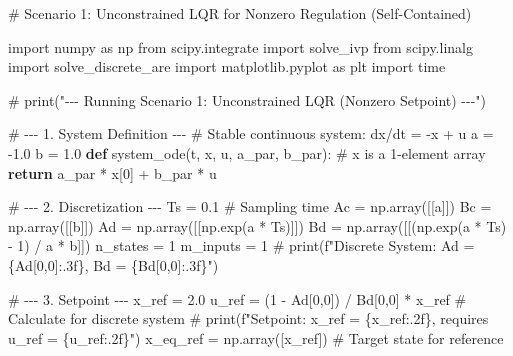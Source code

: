 \documentclass[
  letterpaper,
  DIV=11,
  numbers=noendperiod,
  oneside]{scrartcl}
\newenvironment{Shaded}{\begin{snugshade}}{\end{snugshade}}
\newcommand{\CommentTok}[1]{\textcolor[rgb]{0.37,0.37,0.37}{#1}}
\newcommand{\ControlFlowTok}[1]{\textcolor[rgb]{0.00,0.23,0.31}{\textbf{#1}}}
\newcommand{\DecValTok}[1]{\textcolor[rgb]{0.68,0.00,0.00}{#1}}
\newcommand{\FloatTok}[1]{\textcolor[rgb]{0.68,0.00,0.00}{#1}}
\newcommand{\ImportTok}[1]{\textcolor[rgb]{0.00,0.46,0.62}{#1}}
\newcommand{\KeywordTok}[1]{\textcolor[rgb]{0.00,0.23,0.31}{\textbf{#1}}}
\newcommand{\NormalTok}[1]{\textcolor[rgb]{0.00,0.23,0.31}{#1}}
\newcommand{\OperatorTok}[1]{\textcolor[rgb]{0.37,0.37,0.37}{#1}}
\begin{document}
\begin{Shaded}
\begin{Highlighting}[]
\CommentTok{\# Scenario 1: Unconstrained LQR for Nonzero Regulation (Self{-}Contained)}

\ImportTok{import}\NormalTok{ numpy }\ImportTok{as}\NormalTok{ np}
\ImportTok{from}\NormalTok{ scipy.integrate }\ImportTok{import}\NormalTok{ solve\_ivp}
\ImportTok{from}\NormalTok{ scipy.linalg }\ImportTok{import}\NormalTok{ solve\_discrete\_are}
\ImportTok{import}\NormalTok{ matplotlib.pyplot }\ImportTok{as}\NormalTok{ plt}
\ImportTok{import}\NormalTok{ time}

\CommentTok{\# print("{-}{-}{-} Running Scenario 1: Unconstrained LQR (Nonzero Setpoint) {-}{-}{-}")}

\CommentTok{\# {-}{-}{-} 1. System Definition {-}{-}{-}}
\CommentTok{\# Stable continuous system: dx/dt = {-}x + u}
\NormalTok{a }\OperatorTok{=} \OperatorTok{{-}}\FloatTok{1.0}
\NormalTok{b }\OperatorTok{=} \FloatTok{1.0}
\KeywordTok{def}\NormalTok{ system\_ode(t, x, u, a\_par, b\_par):}
    \CommentTok{\# x is a 1{-}element array}
    \ControlFlowTok{return}\NormalTok{ a\_par }\OperatorTok{*}\NormalTok{ x[}\DecValTok{0}\NormalTok{] }\OperatorTok{+}\NormalTok{ b\_par }\OperatorTok{*}\NormalTok{ u}

\CommentTok{\# {-}{-}{-} 2. Discretization {-}{-}{-}}
\NormalTok{Ts }\OperatorTok{=} \FloatTok{0.1} \CommentTok{\# Sampling time}
\NormalTok{Ac }\OperatorTok{=}\NormalTok{ np.array([[a]])}
\NormalTok{Bc }\OperatorTok{=}\NormalTok{ np.array([[b]])}
\NormalTok{Ad }\OperatorTok{=}\NormalTok{ np.array([[np.exp(a }\OperatorTok{*}\NormalTok{ Ts)]])}
\NormalTok{Bd }\OperatorTok{=}\NormalTok{ np.array([[(np.exp(a }\OperatorTok{*}\NormalTok{ Ts) }\OperatorTok{{-}} \DecValTok{1}\NormalTok{) }\OperatorTok{/}\NormalTok{ a }\OperatorTok{*}\NormalTok{ b]])}
\NormalTok{n\_states }\OperatorTok{=} \DecValTok{1}
\NormalTok{m\_inputs }\OperatorTok{=} \DecValTok{1}
\CommentTok{\# print(f"Discrete System: Ad = \{Ad[0,0]:.3f\}, Bd = \{Bd[0,0]:.3f\}")}

\CommentTok{\# {-}{-}{-} 3. Setpoint {-}{-}{-}}
\NormalTok{x\_ref }\OperatorTok{=} \FloatTok{2.0}
\NormalTok{u\_ref }\OperatorTok{=}\NormalTok{ (}\DecValTok{1} \OperatorTok{{-}}\NormalTok{ Ad[}\DecValTok{0}\NormalTok{,}\DecValTok{0}\NormalTok{]) }\OperatorTok{/}\NormalTok{ Bd[}\DecValTok{0}\NormalTok{,}\DecValTok{0}\NormalTok{] }\OperatorTok{*}\NormalTok{ x\_ref }\CommentTok{\# Calculate for discrete system}
\CommentTok{\# print(f"Setpoint: x\_ref = \{x\_ref:.2f\}, requires u\_ref = \{u\_ref:.2f\}")}
\NormalTok{x\_eq\_ref }\OperatorTok{=}\NormalTok{ np.array([x\_ref]) }\CommentTok{\# Target state for reference}


\end{Highlighting}
\end{Shaded}
\end{document}
